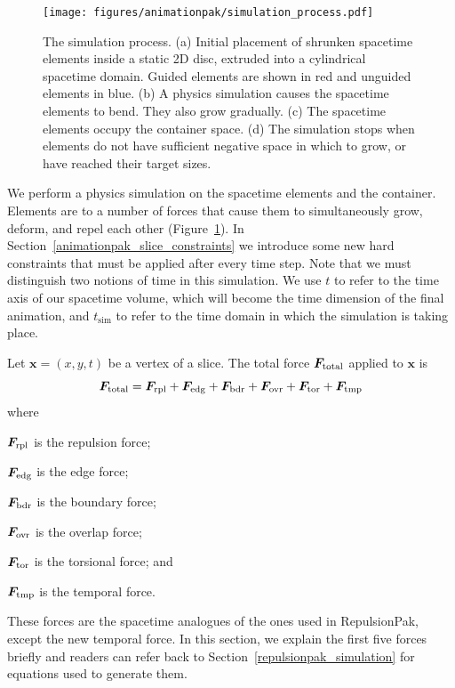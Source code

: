 \begin{figure}[h]
\vspace{-20pt}
\centering
\texttt{[image: figures/animationpak/simulation\_process.pdf]} 
\caption[An illustration of the AnimationPak simulation process]{
\label{fig_animationpak_simulation_process} The simulation process. 
(a) Initial placement of 
shrunken spacetime elements inside a static 2D disc, extruded into a 
cylindrical spacetime domain.
Guided elements are shown in red and unguided elements in blue.
(b) A physics simulation causes the spacetime elements to bend. They
also grow gradually.
(c) The spacetime elements occupy the container space.
(d) The simulation stops when elements do not have sufficient negative
space in which to grow, or have reached their target sizes.
}
\end{figure}

\newtext
{
We perform a physics simulation on the spacetime elements and the 
container.  Elements are  to a number of forces that cause them
to simultaneously grow, deform, and repel each other (Figure~\ref{fig_animationpak_simulation_process}).
In Section~\ref{animationpak_slice_constraints} we introduce some new hard
constraints that must be applied after every time step.
Note that we must distinguish two notions of time in this simulation.  We use
$t$ to refer to the time axis of our spacetime volume, which will become
the time dimension of the final animation, and $t_\mathrm{sim}$ to
refer to the time domain in which the simulation is taking place.
}

\newtext
{
Let $\bm{x} = (x, y, t)$ be a vertex of a slice.
The total force $\bm{F}_\mathrm{total} $ applied to $\bm{x}$ is
\begin{equation}
\bm{F}_\mathrm{total}  = \bm{F}_\mathrm{rpl} + \bm{F}_\mathrm{edg} + \bm{F}_\mathrm{bdr} + \bm{F}_\mathrm{ovr} + \bm{F}_\mathrm{tor} + \bm{F}_\mathrm{tmp}
\end{equation}
where 
\begin{packeddescriptions}
  \item[$\bm{F}_\mathrm{rpl}$] is the repulsion force;
  \item[$\bm{F}_\mathrm{edg}$] is the edge force;
  \item[$\bm{F}_\mathrm{bdr}$] is the boundary force;
  \item[$\bm{F}_\mathrm{ovr}$] is the overlap force;
  \item[$\bm{F}_\mathrm{tor}$] is the torsional force; and 
  \item[$\bm{F}_\mathrm{tmp}$] is the temporal force.  
\end{packeddescriptions}
These forces are the spacetime analogues of the ones used in RepulsionPak, except the new temporal force.
In this section, we explain the first five forces briefly 
and readers can refer back to Section~\ref{repulsionpak_simulation}
for equations used to generate them.
}



